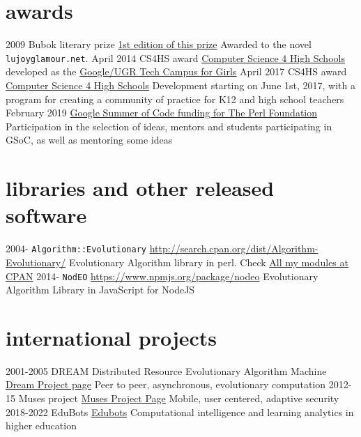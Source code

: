\documentclass[]{friggeri-jj-cv}
\begin{document}
\section{awards}
\begin{entrylist}
 \entry
    {2009}
    {Bubok literary prize}
    {\href{http://cultura.elpais.com/cultura/2009/05/06/actualidad/1241560804_850215.html}{1st
        edition of this prize}}
    {Awarded to the novel {\tt lujoyglamour.net}.}
 \entry
    {April 2014}
    {CS4HS award}
    {\href{http://cs4hs.com}{Computer Science 4 High Schools}}
    {developed as the \href{http://cs4hs.ugr.es}{Google/UGR Tech Campus for Girls}}
 \entry
    {April 2017}
    {CS4HS award}
    {\href{http://cs4hs.com}{Computer Science 4 High Schools}}
    {Development starting on June 1st, 2017, with a program for
      creating a community of practice for K12 and high school
      teachers}
    \entry
    {February 2019}
    {\href{https://summerofcode.withgoogle.com/organizations/4713351599357952/}{Google
        Summer of Code funding for The Perl Foundation}}
    {Participation in the selection of ideas, mentors and students
      participating in GSoC, as well as mentoring some ideas}
    
\end{entrylist}


\section{libraries and other released software}

\begin{entrylist}
  \entry
    {2004-}
    {{\tt Algorithm::Evolutionary}}
    {\href{http://search.cpan.org/dist/Algorithm-Evolutionary/}{http://search.cpan.org/dist/Algorithm-Evolutionary/}}
    {Evolutionary Algorithm library in
      perl. Check \href{http://search.cpan.org/~jmerelo/}{All my modules at CPAN}}
  \entry
    {2014-}
    {{\tt NodEO}}
    {\href{https://npmjs.org/package/nodeo}{https://www.npmjs.org/package/nodeo}}
    {Evolutionary Algorithm Library in JavaScript for NodeJS}
\end{entrylist}

\section{international projects}

\begin{entrylist}
  \entry
    {2001-2005}
    {{\sf DREAM} Distributed Resource Evolutionary Algorithm Machine}
    {\href{http://www.soc.napier.ac.uk/~benp/dream/dream.htm}{Dream
        Project page}}
    {Peer to peer, asynchronous, evolutionary computation}
  \entry
    {2012-15}
    {Muses project}
    {\href{https://musesproject.eu/}{Muses Project Page}}
    {Mobile, user centered, adaptive security}
    \entry
    {2018-2022}
    {EduBots}
    {\href{https://edubots.eu}{Edubots}}
    {Computational intelligence and learning analytics in higher education}
\end{entrylist}
\end{document}
